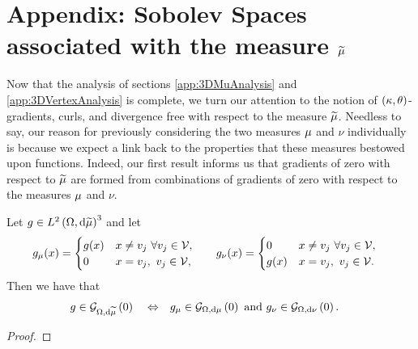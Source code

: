 \section{Appendix: Sobolev Spaces associated with the measure $\widetilde{\mu}$} \label{app:SumMeasureAnalysis}
Now that the analysis of sections \ref{app:3DMuAnalysis} and \ref{app:3DVertexAnalysis} is complete, we turn our attention to the notion of $\left( \kappa, \theta \right)$-gradients, curls, and divergence free with respect to the measure $\widetilde{\mu}$.
Needless to say, our reason for previously considering the two measures $\mu$ and $\nu$ individually is because we expect a link back to the properties that these measures bestowed upon functions.
Indeed, our first result informs us that gradients of zero with respect to $\widetilde{\mu}$ are formed from combinations of gradients of zero with respect to the measures $\mu$ and $\nu$.
\begin{prop} \label{prop:3DThickVertexGradZeroCharacterisation}
	Let $g\in L^{2}\left( \Omega,\mathrm{d}\widetilde{\mu} \right)^3$ and let 
	\begin{align*}
		g_{\mu}(x) = \begin{cases} g(x) & x\neq v_j \ \forall v_j\in\mathcal{V}, \\ 0 & x=v_j, \ v_j\in\mathcal{V}, \end{cases} 
		&\qquad
		g_{\nu}(x) = \begin{cases} 0 & x\neq v_j \ \forall v_j\in\mathcal{V}, \\ g(x) & x=v_j, \ v_j\in\mathcal{V}. \end{cases}
	\end{align*}		
	Then we have that
	\begin{align*}
		g\in\mathcal{G}_{ \Omega, \mathrm{d}\widetilde{\mu}}\left( 0 \right) \quad\Leftrightarrow\quad 
		& g_{\mu}\in\mathcal{G}_{ \Omega, \mathrm{d}\mu}\left( 0 \right) \text{ and } g_{\nu}\in\mathcal{G}_{ \Omega, \mathrm{d}\nu}\left( 0 \right).
	\end{align*}
\end{prop}
\begin{proof}
\end{proof}

